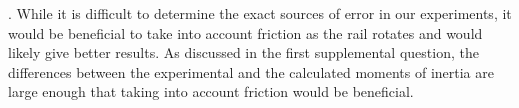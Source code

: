 \documentclass [12pt, letterpaper, twoside] {article}
\begin{document}
. While it is difficult to determine the exact sources of error in our experiments, it would be beneficial to take into account friction as the rail rotates and would likely give better results. As discussed in the first supplemental question, the differences between the experimental and the calculated moments of inertia are large enough that taking into account friction would be beneficial.
\end{document}
